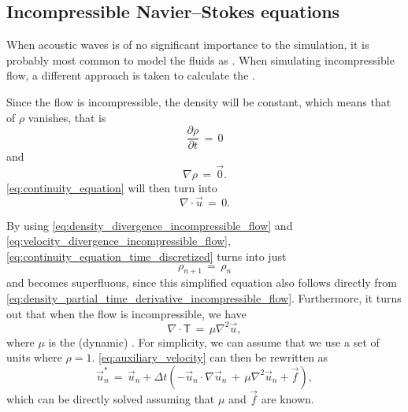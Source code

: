 \subsection{Incompressible Navier--Stokes equations}

When acoustic waves is of no significant importance to the simulation, it is probably most common to model the fluids as \incompressible. When simulating incompressible flow, a different approach is taken to calculate the .

Since the flow is incompressible, the density will be constant, which means that \derivatives of $\rho$ vanishes, that is
%
\begin{equation} \label{eq:density_partial_time_derivative_incompressible_flow}
\frac{\partial \rho}{\partial t} \,=\, 0
\end{equation}
%
and
%
\begin{equation} \label{eq:density_divergence_incompressible_flow}
\nabla\rho \,=\, \vec{0}.
\end{equation}
%
\eqref{eq:continuity_equation} will then turn into
%
\begin{equation} \label{eq:velocity_divergence_incompressible_flow}
\nabla\cdot\vec{u} \,=\, 0.
\end{equation}

By using \eqref{eq:density_divergence_incompressible_flow} and \eqref{eq:velocity_divergence_incompressible_flow}, \eqref{eq:continuity_equation_time_discretized} turns into just
%
\begin{equation} \label{eq:continuity_equation_superfluous}
{\rho_{n+1} \,=\, \rho_n}
\end{equation}
%
and becomes superfluous, since this simplified equation also follows directly from \eqref{eq:density_partial_time_derivative_incompressible_flow}. Furthermore, it turns out that when the flow is incompressible, we have
%
\begin{equation} \label{eq:deviatoric_stress_tensor_incompressible_flow}
\nabla\cdot\boldsymbol{\mathsf{T}} \,=\, \mu\nabla^2\vec{u},
\end{equation}
%
where $\mu$ is the (dynamic) \viscosity \citep{Batchelor1967}. For simplicity, we can assume that we use a set of units where $\rho = 1$. \eqref{eq:auxiliary_velocity} can then be rewritten as
%
\begin{equation} \label{eq:auxiliary_velocity_reduced}
\vec{u}^*_n \,= \, \vec{u}_{n} + \Delta t(- \vec{u}_{n}\cdot\nabla\vec{u}_{n} \,+\, \mu\nabla^2\vec{u}_{n} + \vec{f}),
\end{equation}
%
which can be directly solved assuming that $\mu$ and $\vec{f}$ are known.

